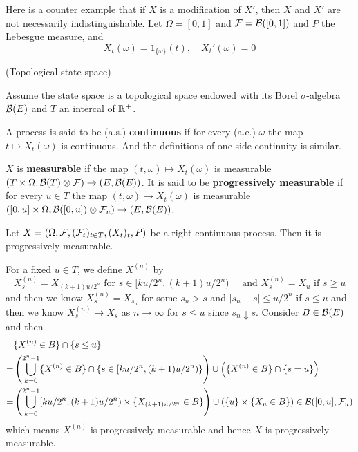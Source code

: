 \begin{example}
    Here is a counter example that if $X$ is a modification of $X'$, then $X$ and $X'$ are not necessarily indistinguishable. Let $\Omega = [0,1]$ and $\mathcal{F} = \mathcal{B}([0,1])$ and $P$ the Lebesgue measure, and
    \[X_t(\omega) = 1_{\{\omega\}}(t),\quad X_t'(\omega) = 0\]
\end{example}

\begin{definition}
    (Topological state space)\par
    Assume the state space is a topological space endowed with its Borel $\sigma$-algebra $\mathcal{B}(E)$ and $T$ an intercal of $\mathbb{R}^+$.\par
    A process is said to be (a.s.) \textbf{continuous} if for every (a.e.) $\omega$ the map $t\mapsto X_t(\omega)$ is continuous. And the definitions of one side continuity is similar.\par
    $X$ is \textbf{measurable} if the map $(t,\omega)\mapsto X_t(\omega)$ is measurable $(T\times \Omega,\mathcal{B} (T)\otimes \mathcal{F}) \to (E,\mathcal{B}(E))$. It is said to be \textbf{progressively measurable} if for every $u \in T$ the map $(t,\omega) \to X_t(\omega)$ is measurable $([0,u]\times\Omega, \mathcal{B}([0,u])\otimes \mathcal{F}_u) \to (E,\mathcal{B}(E))$.
\end{definition}

\begin{proposition}
    Let $X = (\Omega,\mathcal{F},(\mathcal{F}_t)_{t\in T},(X_t)_t,P)$ be a right-continuous process. Then it is progressively measurable.
\end{proposition}
\Pf\par
    For a fixed $u\in T$, we define $X^{(n)}$ by
    \[
    X_s^{(n)} = X_{(k+1)u/2^n}\text{ for }s\in [ku/2^n,(k+1)u/2^n)\quad\text{ and }X_s^{(n)} = X_u\text{ if }s\geq u
    \]
    and then we know $X_s^{(n)} = X_{s_n}$ for some $s_n > s$ and $|s_n - s| \leq u/2^n$ if $s \leq u$ and then we know $X_s^{(n)} \to X_s$ as $n\to \infty$ for $s\leq u$ since $s_n \downarrow s$. Consider $B \in \mathcal{B}(E)$ and then
    \[
    \begin{aligned}
       & \{X^{(n)} \in B\}\cap \{s\leq u\} \\ =& \left(\bigcup_{k=0}^{2^n-1}\{X^{(n)} \in B\}\cap \{s\in [ku/2^n,(k+1)u/2^n)\}\right) \cup \left(\{X^{(n)} \in B\}\cap \{s=u\}\right)\\
        =& \left(\bigcup_{k=0}^{2^n-1} [ku/2^n,(k+1)u/2^n)\times\{X_{(k+1)u/2^n} \in B\}\right) \cup \left(\{u\}\times \{X_u \in B\}\right)\in \mathcal{B}([0,u],\mathcal{F}_u)\\
    \end{aligned}
    \]
    which means $X^(n)$ is progressively measurable and hence $X$ is progressively measurable.

